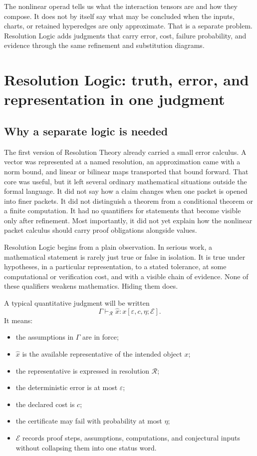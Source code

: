 \documentclass[11pt]{article}
\theoremstyle{definition}
\theoremstyle{remark}
\begin{document}
The nonlinear operad tells us what the interaction tensors are and how they compose.  It does not by itself say what may be concluded when the inputs, charts, or retained hyperedges are only approximate.  That is a separate problem.  Resolution Logic adds judgments that carry error, cost, failure probability, and evidence through the same refinement and substitution diagrams.

\section{Resolution Logic: truth, error, and representation in one judgment}
\label{sec:resolution-logic}

\subsection{Why a separate logic is needed}

The first version of Resolution Theory already carried a small error calculus.  A vector was represented at a named resolution, an approximation came with a norm bound, and linear or bilinear maps transported that bound forward.  That core was useful, but it left several ordinary mathematical situations outside the formal language.  It did not say how a claim changes when one packet is opened into finer packets.  It did not distinguish a theorem from a conditional theorem or a finite computation.  It had no quantifiers for statements that become visible only after refinement.  Most importantly, it did not yet explain how the nonlinear packet calculus should carry proof obligations alongside values.

Resolution Logic begins from a plain observation.  In serious work, a mathematical statement is rarely just true or false in isolation.  It is true under hypotheses, in a particular representation, to a stated tolerance, at some computational or verification cost, and with a visible chain of evidence.  None of these qualifiers weakens mathematics.  Hiding them does.

A typical quantitative judgment will be written
\[
   \Gamma\vdash_{\mathcal R}
   \widehat x : x
   [\varepsilon,c,\eta;\mathcal E].
\]
It means:
\begin{itemize}
\item the assumptions in $\Gamma$ are in force;
\item $\widehat x$ is the available representative of the intended object $x$;
\item the representative is expressed in resolution $\mathcal R$;
\item the deterministic error is at most $\varepsilon$;
\item the declared cost is $c$;
\item the certificate may fail with probability at most $\eta$;
\item $\mathcal E$ records proof steps, assumptions, computations, and conjectural inputs without collapsing them into one status word.
\end{itemize}
\end{document}
